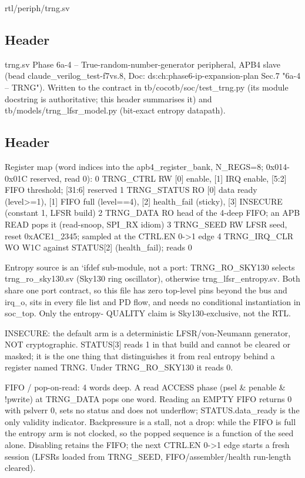 \begin{relocated}{rtl/periph/trng.sv}

\subsection*{Header}

\begin{textblock}
trng.sv
Phase 6a-4 -- True-random-number-generator peripheral, APB4 slave (bead
claude_verilog_test-f7vs.8, Doc: ds:ch:phase6-ip-expansion-plan Sec.7 "6a-4 -- TRNG"). Written to
the contract in tb/cocotb/soc/test_trng.py (its module docstring is authoritative; this header
summarises it) and tb/models/trng_lfsr_model.py (bit-exact entropy datapath).
\end{textblock}

\subsection*{Header}

\begin{textblock}
Register map (word indices into the apb4_register_bank, N_REGS=8; 0x014-0x01C reserved, read 0):
  0  TRNG_CTRL     RW  [0] enable, [1] IRQ enable, [5:2] FIFO threshold; [31:6] reserved
  1  TRNG_STATUS   RO  [0] data ready (level>=1), [1] FIFO full (level==4),
                       [2] health_fail (sticky), [3] INSECURE (constant 1, LFSR build)
  2  TRNG_DATA     RO  head of the 4-deep FIFO; an APB READ pops it (read-snoop, SPI_RX idiom)
  3  TRNG_SEED     RW  LFSR seed, reset 0xACE1_2345; sampled at the CTRL.EN 0->1 edge
  4  TRNG_IRQ_CLR  WO  W1C against STATUS[2] (health_fail); reads 0

Entropy source is an `ifdef sub-module, not a port: TRNG_RO_SKY130 selects
trng_ro_sky130.sv (Sky130 ring oscillator), otherwise trng_lfsr_entropy.sv. Both share one
port contract, so this file has zero top-level pins beyond the bus and irq_o, sits in every
file list and PD flow, and needs no conditional instantiation in soc_top. Only the entropy-
QUALITY claim is Sky130-exclusive, not the RTL.

INSECURE: the default arm is a deterministic LFSR/von-Neumann generator, NOT cryptographic.
STATUS[3] reads 1 in that build and cannot be cleared or masked; it is the one thing that
distinguishes it from real entropy behind a register named TRNG. Under TRNG_RO_SKY130 it
reads 0.

FIFO / pop-on-read: 4 words deep. A read ACCESS phase (psel & penable & !pwrite) at TRNG_DATA
pops one word. Reading an EMPTY FIFO returns 0 with pslverr 0, sets no status and does not
underflow; STATUS.data_ready is the only validity indicator. Backpressure is a stall, not a
drop: while the FIFO is full the entropy arm is not clocked, so the popped sequence is a
function of the seed alone. Disabling retains the FIFO; the next CTRL.EN 0->1 edge starts a
fresh session (LFSRs loaded from TRNG_SEED, FIFO/assembler/health run-length cleared).


\end{textblock}
\end{relocated}
